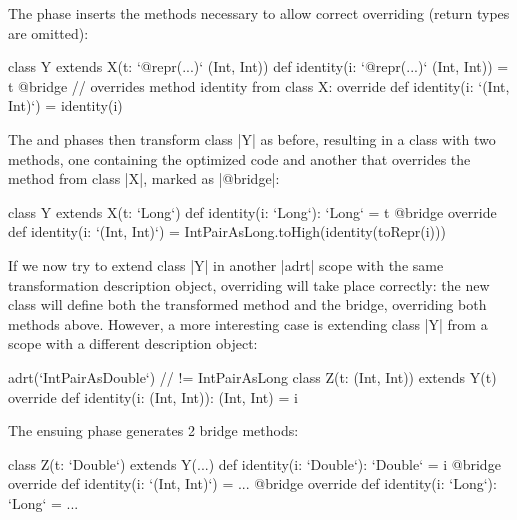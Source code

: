 The \bridge{} phase inserts the methods necessary to allow correct overriding (return types are omitted):

\begin{lstlisting-nobreak}
class Y extends X(t: `@repr(...)` (Int, Int)) {
  def identity(i: `@repr(...)` (Int, Int)) = t
  @bridge // overrides method identity from class X:
  override def identity(i: `(Int, Int)`) = identity(i)
}
\end{lstlisting-nobreak}

The \coerce{} and \commit{} phases then transform class |Y| as before, resulting in a class with two methods, one containing the optimized code and another that overrides the method from class |X|, marked as |@bridge|:

\begin{lstlisting-nobreak}
class Y extends X(t: `Long`) {
  def identity(i: `Long`): `Long` = t
  @bridge override def identity(i: `(Int, Int)`) =
    IntPairAsLong.toHigh(identity(toRepr(i)))
}
\end{lstlisting-nobreak}

If we now try to extend class |Y| in another |adrt| scope with the same transformation description object, overriding will take place correctly: the new class will define both the transformed method and the bridge, overriding both methods above. However, a more interesting case is extending class |Y| from a scope with a different description object:

\begin{lstlisting-nobreak}
adrt(`IntPairAsDouble`) { // != IntPairAsLong
  class Z(t: (Int, Int)) extends Y(t) {
    override def identity(i: (Int, Int)): (Int, Int) = i
  }
}
\end{lstlisting-nobreak}

The ensuing \bridge{} phase generates 2 bridge methods: %

\begin{lstlisting-nobreak}
class Z(t: `Double`) extends Y(...) {
  def identity(i: `Double`): `Double` = i
  @bridge override def identity(i: `(Int, Int)`) = ...
  @bridge override def identity(i: `Long`): `Long` = ...
}
\end{lstlisting-nobreak}


